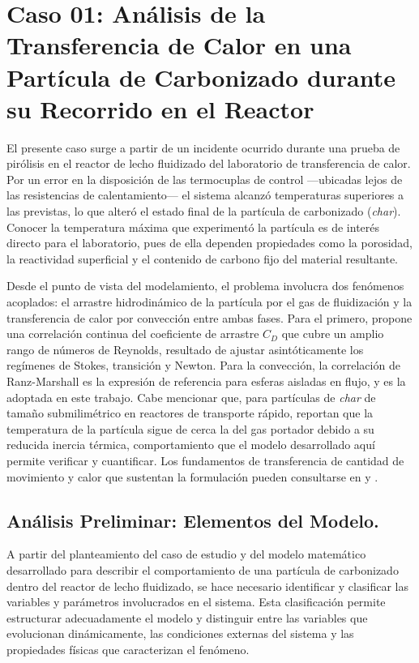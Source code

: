 \documentclass[11pt,stdletter,orderfromtodate,sigleft,twoside]{report}
\begin{document}
\newpage



\section{Caso 01: Análisis de la Transferencia de Calor en una Partícula
         de Carbonizado durante su Recorrido en el Reactor}

El presente caso surge a partir de un incidente ocurrido durante una prueba 
de pirólisis en el reactor de lecho fluidizado del laboratorio de transferencia 
de calor. Por un error en la disposición de las termocuplas de control —ubicadas 
lejos de las resistencias de calentamiento— el sistema alcanzó temperaturas 
superiores a las previstas, lo que alteró el estado final de la partícula de 
carbonizado (\textit{char}). Conocer la temperatura máxima que experimentó la 
partícula es de interés directo para el laboratorio, pues de ella dependen 
propiedades como la porosidad, la reactividad superficial y el contenido de 
carbono fijo del material resultante.

Desde el punto de vista del modelamiento, el problema involucra dos fenómenos 
acoplados: el arrastre hidrodinámico de la partícula por el gas de fluidización 
y la transferencia de calor por convección entre ambas fases. Para el primero, 
\textcite{Almedeij2008} propone una correlación continua del coeficiente de arrastre 
$C_D$ que cubre un amplio rango de números de Reynolds, resultado de ajustar 
asintóticamente los regímenes de Stokes, transición y Newton. Para la convección, 
la correlación de Ranz-Marshall \parencite{RanzMarshall1952} es la expresión de 
referencia para esferas aisladas en flujo, y es la adoptada en este trabajo. 
Cabe mencionar que, para partículas de \textit{char} de tamaño submilimétrico 
en reactores de transporte rápido, \textcite{Hercel2025} reportan que la temperatura 
de la partícula sigue de cerca la del gas portador debido a su reducida inercia 
térmica, comportamiento que el modelo desarrollado aquí permite verificar y 
cuantificar. Los fundamentos de transferencia de cantidad de movimiento y calor 
que sustentan la formulación pueden consultarse en \textcite{Incropera2007} y 
\textcite{BirdStewartLightfoot2002}.
\medskip


\subsection{An\'alisis Preliminar: Elementos del Modelo.}
A partir del planteamiento del caso de estudio y del modelo matemático desarrollado para describir el comportamiento de una partícula de carbonizado dentro del reactor de lecho fluidizado, se hace necesario identificar y clasificar las variables y parámetros involucrados en el sistema. Esta clasificación permite estructurar adecuadamente el modelo y distinguir entre las variables que evolucionan dinámicamente, las condiciones externas del sistema y las propiedades físicas que caracterizan el fenómeno.
\medskip
\end{document}
